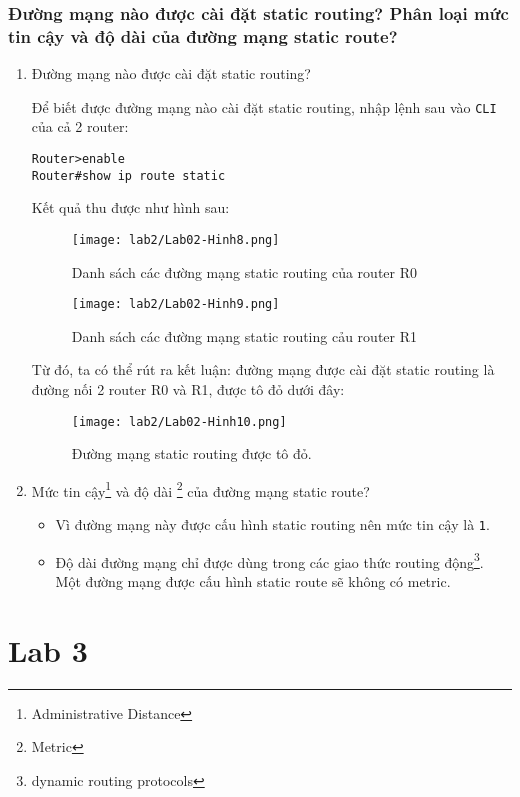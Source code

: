 \documentclass[]{article}
\begin{document}
\subsubsection{Đường mạng nào được cài đặt static routing? Phân loại mức tin cậy và độ dài của đường mạng static route?}
\begin{enumerate}
\item Đường mạng nào được cài đặt static routing?

Để biết được đường mạng nào cài đặt static routing, nhập lệnh sau vào \texttt{CLI} của cả 2 router:
\begin{lstlisting}
Router>enable
Router#show ip route static
\end{lstlisting}
Kết quả thu được như hình sau:
\begin{figure}[H]
    \centering
    \texttt{[image: lab2/Lab02-Hinh8.png]}
    \caption{Danh sách các đường mạng static routing của router R0}
\end{figure}
\begin{figure}[H]
    \centering
    \texttt{[image: lab2/Lab02-Hinh9.png]}
    \caption{Danh sách các đường mạng static routing cảu router R1}
\end{figure}
Từ đó, ta có thể rút ra kết luận: đường mạng được cài đặt static routing là đường nối 2 router R0 và R1, được tô đỏ dưới đây:
\begin{figure}[H]
    \centering
    \texttt{[image: lab2/Lab02-Hinh10.png]}
    \caption{Đường mạng static routing được tô đỏ.}
\end{figure}
\item Mức tin cậy\footnote{Administrative Distance} và độ dài \footnote{Metric} của đường mạng static route?
\begin{itemize}
\item Vì đường mạng này được cấu hình static routing nên mức tin cậy là \texttt{1}\cite{cisco:ad}.
\item Độ dài đường mạng chỉ được dùng trong các giao thức routing động\footnote{dynamic routing protocols}. Một đường mạng được cấu hình static route sẽ không có metric.\cite{cisco:metric}
\end{itemize}
\end{enumerate}
\section{Lab 3}
\end{document}
